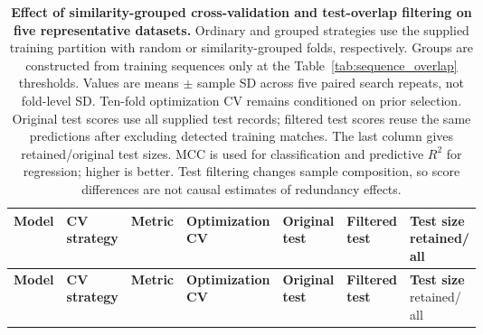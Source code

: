 \begingroup
\small
\setlength{\tabcolsep}{3pt}
\renewcommand{\arraystretch}{1.15}
\setlength{\LTleft}{0pt}
\setlength{\LTright}{0pt}
\setlength{\LTcapwidth}{\linewidth}
\begin{longtable}{@{}>{\raggedright\arraybackslash}p{}>{\centering\arraybackslash}p{}>{\centering\arraybackslash}p{}>{\centering\arraybackslash}p{}>{\centering\arraybackslash}p{}>{\centering\arraybackslash}p{}>{\centering\arraybackslash}p{}@{}}
\caption{\textbf{Effect of similarity-grouped cross-validation and test-overlap filtering on five representative datasets.} Ordinary and grouped strategies use the supplied training partition with random or similarity-grouped folds, respectively. Groups are constructed from training sequences only at the Table~\ref{tab:sequence_overlap} thresholds. Values are means $\pm$ sample SD across five paired search repeats, not fold-level SD. Ten-fold optimization CV remains conditioned on prior selection. Original test scores use all supplied test records; filtered test scores reuse the same predictions after excluding detected training matches. The last column gives retained/original test sizes. MCC is used for classification and predictive $R^2$ for regression; higher is better. Test filtering changes sample composition, so score differences are not causal estimates of redundancy effects.}\label{tab:homology_evaluation}\\
\toprule
\textbf{Model} & \shortstack{\textbf{CV}\\\textbf{strategy}} & \textbf{Metric} & \shortstack{\textbf{Optimization}\\\textbf{CV}} & \shortstack{\textbf{Original}\\\textbf{test}} & \shortstack{\textbf{Filtered}\\\textbf{test}} & \shortstack{\textbf{Test size}\\retained/\\all} \\
\midrule
\endfirsthead
\toprule
\textbf{Model} & \shortstack{\textbf{CV}\\\textbf{strategy}} & \textbf{Metric} & \shortstack{\textbf{Optimization}\\\textbf{CV}} & \shortstack{\textbf{Original}\\\textbf{test}} & \shortstack{\textbf{Filtered}\\\textbf{test}} & \shortstack{\textbf{Test size}\\retained/\\all} \\

\end{longtable}
